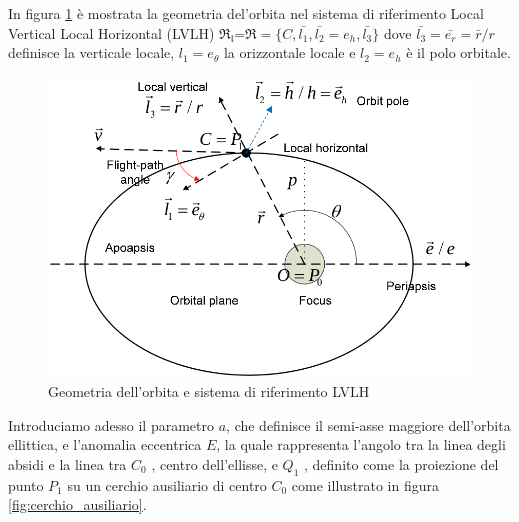 In figura \ref{fig:LVLH} è mostrata la
geometria del'orbita nel sistema di riferimento Local Vertical Local Horizontal (LVLH)
$\mathfrak{R_l}$=$\mathfrak{R}=\{C,\bar{l_1},\bar{l_2}=e_h,\bar{l_3}\}$ dove
$\bar{l_3}=\bar{e_r}=\bar{r}/r$ definisce la verticale locale, $l_1=e_{\theta}$
la orizzontale locale e $l_2=e_h$ è il polo orbitale.
\begin{figure}[htp]
\begin{center}
  \includegraphics[width=\textwidth]{modelling/orbit_dynamics/image/LVLH.png}
  \caption{Geometria dell'orbita e sistema di riferimento LVLH}
  \label{fig:LVLH}
\end{center}
\end{figure}


Introduciamo adesso il parametro $a$, che definisce il semi-asse maggiore
dell'orbita ellittica, e l'anomalia eccentrica $E$, la quale rappresenta
l'angolo tra la linea degli absidi e la linea tra $C_0$ , centro dell’ellisse, e $Q_1$ ,
definito come la proiezione del punto $P_1$ su un cerchio ausiliario di centro
$C_0$ come illustrato in figura \ref{fig:cerchio_ausiliario}.


